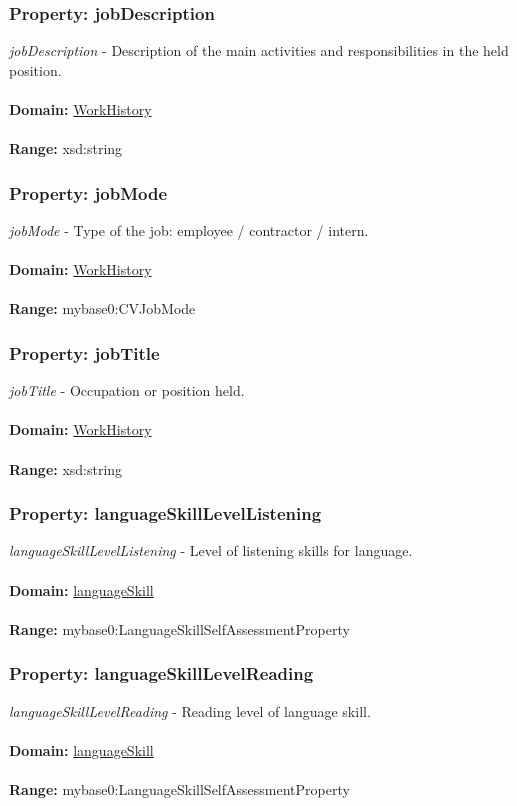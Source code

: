 \documentclass[a4paper,12pt]{article}
\numberwithin{equation}{section}
\begin{document}
\subsubsection{Property: jobDescription}\hypertarget{jobDescription}{}
\textit{jobDescription} - Description of the main activities and responsibilities in the held position.
\\\\
\textbf{Domain:} \hyperlink{WorkHistory}{WorkHistory} 
\\\\
\textbf{Range:}  xsd:string

\subsubsection{Property: jobMode}\hypertarget{jobMode}{}
\textit{jobMode} - Type of the job: employee / contractor / intern.
\\\\
\textbf{Domain:} \hyperlink{WorkHistory}{WorkHistory} 
\\\\
\textbf{Range:}  mybase0:CVJobMode

\subsubsection{Property: jobTitle}\hypertarget{jobTitle}{}
\textit{jobTitle} - Occupation or position held.
\\\\
\textbf{Domain:} \hyperlink{WorkHistory}{WorkHistory} 
\\\\
\textbf{Range:}   xsd:string

\subsubsection{Property: languageSkillLevelListening}\hypertarget{languageSkillLevelListening}{}
\textit{languageSkillLevelListening} - Level of listening skills for language.
\\\\
\textbf{Domain:} \hyperlink{languageSkill}{languageSkill} 
\\\\
\textbf{Range:}   mybase0:LanguageSkillSelfAssessmentProperty 

\subsubsection{Property: languageSkillLevelReading}\hypertarget{languageSkillLevelReading}{}
\textit{languageSkillLevelReading} - Reading level of language skill.
\\\\
\textbf{Domain:} \hyperlink{languageSkill}{languageSkill} 
\\\\
\textbf{Range:}   mybase0:LanguageSkillSelfAssessmentProperty 
\end{document}
